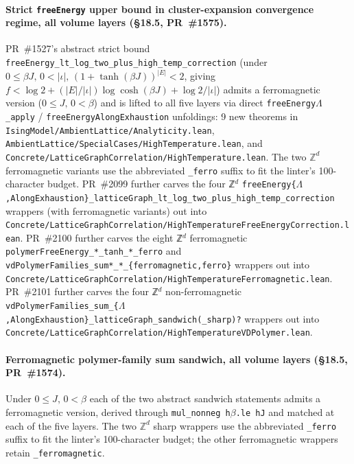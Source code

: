 \documentclass[a4paper,11pt]{article}
\newcommand{\LeanLambda}{\texorpdfstring{\ensuremath{\Lambda}}{Lambda}}
\begin{document}
\paragraph{Strict \texttt{freeEnergy} upper bound in cluster-expansion
convergence regime, all volume layers (\S18.5, PR~\#1575).}
PR~\#1527's abstract strict bound
\texttt{freeEnergy\_lt\_log\_two\_plus\_high\_temp\_correction}
(under $0 \le \beta J,\, 0 < |\iota|,\, (1+\tanh(\beta J))^{|E|} < 2$,
giving
$f < \log 2 + (|E|/|\iota|) \log\cosh(\beta J) + \log 2/|\iota|$)
admits a ferromagnetic version
($0 \le J,\, 0 < \beta$) and is lifted to all five layers via
direct \texttt{freeEnergy\LeanLambda\_apply} / \texttt{freeEnergyAlongExhaustion}
unfoldings: 9 new theorems in
\texttt{IsingModel/AmbientLattice/Analyticity.lean},
\texttt{AmbientLattice/SpecialCases/HighTemperature.lean}, and
\texttt{Concrete/LatticeGraphCorrelation/HighTemperature.lean}. The two
$\mathbb{Z}^d$ ferromagnetic variants use the abbreviated
\texttt{\_ferro} suffix to fit the linter's 100-character budget.
PR~\#2099 further carves the four ℤ$^d$
\texttt{freeEnergy\{$\Lambda$,AlongExhaustion\}\_latticeGraph\_lt\_log\_two\_plus\_high\_temp\_correction}
wrappers (with ferromagnetic variants) out into
\texttt{Concrete/LatticeGraphCorrelation/HighTemperatureFreeEnergyCorrection.lean}.
PR~\#2100 further carves the eight ℤ$^d$ ferromagnetic
\texttt{polymerFreeEnergy\_*\_tanh\_*\_ferro} and
\texttt{vdPolymerFamilies\_sum*\_*\_\{ferromagnetic,ferro\}} wrappers
out into
\texttt{Concrete/LatticeGraphCorrelation/HighTemperatureFerromagnetic.lean}.
PR~\#2101 further carves the four ℤ$^d$ non-ferromagnetic
\texttt{vdPolymerFamilies\_sum\_\{$\Lambda$,AlongExhaustion\}\_latticeGraph\_sandwich(\_sharp)?}
wrappers out into
\texttt{Concrete/LatticeGraphCorrelation/HighTemperatureVDPolymer.lean}.

\paragraph{Ferromagnetic polymer-family sum sandwich, all volume
layers (\S18.5, PR~\#1574).} Under $0 \le J,\, 0 < \beta$ each of
the two abstract sandwich statements admits a ferromagnetic
version, derived through \texttt{mul\_nonneg h$\beta$.le hJ} and
matched at each of the five layers. The two $\mathbb{Z}^d$ sharp
wrappers use the abbreviated \texttt{\_ferro} suffix to fit the
linter's 100-character budget; the other ferromagnetic wrappers
retain \texttt{\_ferromagnetic}.
\end{document}

